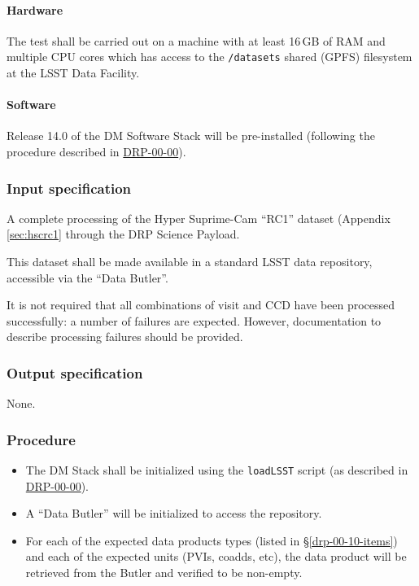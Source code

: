 \paragraph{Hardware}

The test shall be carried out on a machine with at least 16\,GB of RAM and
multiple CPU cores which has access to the \texttt{/datasets} shared (GPFS)
filesystem at the LSST Data Facility.

\paragraph{Software}

Release 14.0 of the DM Software Stack will be pre-installed (following the
procedure described in \hyperref[drp-00-00]{DRP-00-00}).

\subsubsection{Input specification}

A complete processing of the Hyper Suprime-Cam ``RC1'' dataset (Appendix
\ref{sec:hscrc1} through the DRP Science Payload.

This dataset shall be made available in a standard LSST data repository,
accessible via the ``Data Butler''.

It is not required that all combinations of visit and CCD have been processed
successfully: a number of failures are expected. However, documentation to
describe processing failures should be provided.

\subsubsection{Output specification}

None.

\subsubsection{Procedure}

\begin{itemize}

  \item{The DM Stack shall be initialized using the \texttt{loadLSST} script
  (as described in \hyperref[drp-00-00]{DRP-00-00}).}

  \item{A ``Data Butler'' will be initialized to access the repository.}

  \item{For each of the expected data products types (listed in \S\ref{drp-00-10-items})
  and each of the expected units (PVIs, coadds, etc), the data product will be
  retrieved from the Butler and verified to be non-empty.}

\end{itemize}
